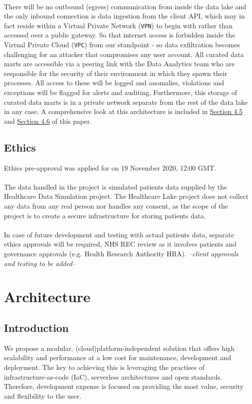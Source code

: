 \documentclass[10pt]{article}
\begin{document}
\paragraph{}
There will be no outbound (egress) communication from inside the data lake and the only inbound connection is data ingestion from the client API, which may in fact reside within a Virtual Private Network (\texttt{VPN}) to begin with rather than accessed over a public gateway. So that internet access is forbidden inside the Virtual Private Cloud (\texttt{VPC}) from our standpoint - so data exfiltration becomes challenging for an attacker that compromises any user account. All curated data marts are accessible via a peering link with the Data Analytics team who are responsible for the security of their environment in which they spawn their processes. All access to these will be logged and anomalies, violations and exceptions will be flagged for alerts and auditing. Furthermore, this  storage of curated data marts is in a private network separate from the rest of the data lake in any case. A comprehensive look at this architecture is included in \hyperref[sec:secure_access]{Section 4.5} and \hyperref[sec:network]{Section 4.6} of this paper. 

\subsection{Ethics}
Ethics pre-approval was applied for on 19 November 2020, 12:00 GMT. 
\\
\\
The data handled in the project is simulated patients data supplied by the Healthcare Data Simulation project. The Healthcare Lake project does not collect any data from any real person nor handles any consent, as the scope of the project is to create a secure infrastructure for storing patients data. \\ \\
In case of future development and testing with actual patients data, separate ethics approvals will be required, NHS REC review as it involves patients and governance approvals (e.g. Health Research Authority HRA). \emph{--client approvals and testing to be added--}

\newpage
\section{Architecture}
\subsection{Introduction}
We propose a modular, (cloud)platform-independent solution that offers high scalability and performance at a low cost for maintenance, development and deployment. The key to achieving this is leveraging the practises of infrastructure-as-code (IaC), serverless architectures and open standards. Therefore, development expense is focused on providing the most value, security and flexibility to the user.\\
\end{document}
